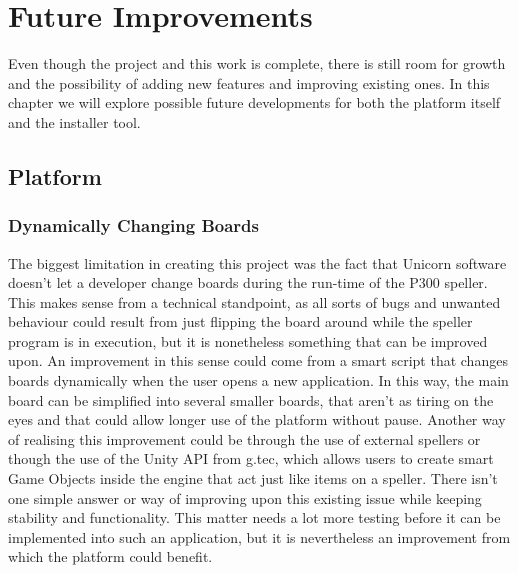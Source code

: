 
\chapter{Future Improvements}\label{cap:future}
Even though the project and this work is complete, there is still room for growth and the possibility of adding new features and improving existing ones. In this chapter we will explore possible future developments for both the platform itself and the installer tool.

\section{Platform}
\subsection{Dynamically Changing Boards}
The biggest limitation in creating this project was the fact that Unicorn software doesn't let a developer change boards during the run-time of the P300 speller. This makes sense from a technical standpoint, as all sorts of bugs and unwanted behaviour could result from just flipping the board around while the speller program is in execution, but it is nonetheless something that can be improved upon.
\vspace{\baselineskip}\newline
An improvement in this sense could come from a smart script that changes boards dynamically when the user opens a new application. In this way, the main board can be simplified into several smaller boards, that aren't as tiring on the eyes and that could allow longer use of the platform without pause. Another way of realising this improvement could be through the use of external spellers or though the use of the Unity API from g.tec, which allows users to create smart Game Objects inside the engine that act just like items on a speller. 
\vspace{\baselineskip}\newline
There isn't one simple answer or way of improving upon this existing issue while keeping stability and functionality. This matter needs a lot more testing before it can be implemented into such an application, but it is nevertheless an improvement from which the platform could benefit.


